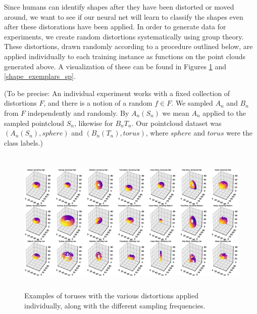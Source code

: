 \documentclass{article}
\begin{document}
Since humans can identify shapes after they have been distorted or moved around,
we want to see if our neural net will learn to classify the shapes even after these
distorations have been applied. In order to generate data for experiments,
we create random distortions systematically using group theory. These distortions, drawn randomly according to a procedure outlined below, are applied individually
to each training instance as functions on the point clouds generated above. A visualization of
these can be found in Figures \ref{shape_exemplars_to} and \ref{shape_exemplars_sp}.

(To be precise:
An individual experiment works with a fixed collection of distortions $F$, and there is a notion of a random $f \in F$.
We sampled $A_n$ and $B_n$ from $F$ independently and randomly. By $A_n(S_n)$ we mean $A_n$ applied to the sampled pointcloud $S_n$, likewise for $B_n T_n$.
Our pointcloud dataset was $(A_n(S_n), sphere)$ and $(B_n(T_n), torus)$, where $sphere$ and $torus$ were the class labels.)

\begin{figure}%
\vskip 0.2in
\begin{center}
\centerline{\includegraphics[height=7cm]{graphics/shape_exemplars_to}}
\caption{Examples of toruses with the various distortions applied individually, along with the different sampling frequencies.}
\label{shape_exemplars_to}
\end{center}
\vskip -0.2in
\end{figure}
\end{document}
